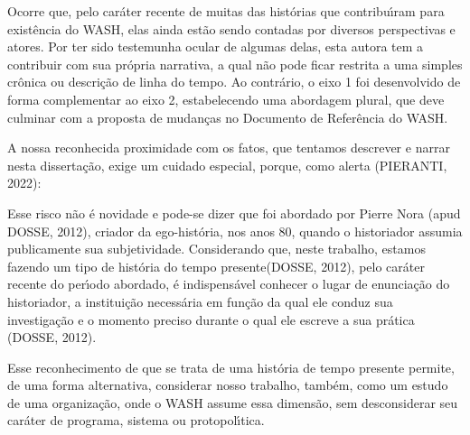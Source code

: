 \documentclass[
12pt,		%
openright,	%
twoside,  %
a4paper,			%
chapter=TITLE,		%
english,			%
french,				%
spanish,			%
brazil				%
]{USPSC-classe/USPSC}
\begin{document}
Ocorre que, pelo car\'ater recente de muitas das hist\'orias que contribu\'{\i}ram para exist\^encia do WASH, elas ainda est\~ao sendo contadas por diversos perspectivas e atores. Por ter sido testemunha ocular de algumas delas, esta autora tem a contribuir com sua pr\'opria narrativa, a qual n\~ao pode ficar restrita a uma simples cr\^onica ou descri\c{c}\~ao de linha do tempo. Ao contr\'ario, o eixo 1 foi desenvolvido de forma complementar ao eixo 2, estabelecendo uma abordagem plural, que deve culminar com a proposta de mudan\c{c}as no Documento de Refer\^encia do WASH.









A nossa reconhecida proximidade com os fatos, que tentamos descrever e narrar nesta disserta\c{c}\~ao, exige um cuidado especial, porque, como alerta  (PIERANTI, 2022):










\noindent\begin{center}\mbox{\centering{}}\end{center}


Esse risco n\~ao \'e novidade e pode-se dizer que foi abordado por Pierre Nora  (apud DOSSE, 2012), criador da ego-hist\'oria, nos anos 80, quando o historiador assumia publicamente sua subjetividade. Considerando que, neste trabalho, estamos fazendo um tipo de \textquotedbl hist\'oria do tempo presente\textquotedbl   (DOSSE, 2012), pelo car\'ater recente do per\'{\i}odo abordado, \'e indispens\'avel \textquotedbl conhecer o lugar de enuncia\c{c}\~ao do historiador, a institui\c{c}\~ao necess\'aria em fun\c{c}\~ao da qual ele conduz sua investiga\c{c}\~ao e o momento preciso durante o qual ele escreve a sua pr\'atica \textquotedbl   (DOSSE, 2012).









Esse reconhecimento de que se trata de uma hist\'oria de tempo presente permite, de uma forma alternativa, considerar nosso trabalho, tamb\'em, como um estudo de uma organiza\c{c}\~ao, onde o WASH assume essa dimens\~ao, sem desconsiderar seu car\'ater de  programa, sistema ou protopol\'{\i}tica.
\end{document}
